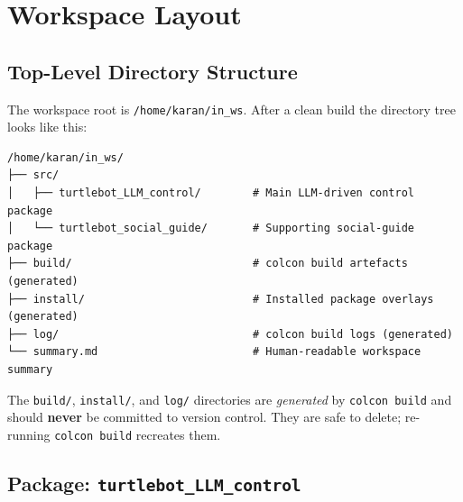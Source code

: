\documentclass[12pt,a4paper]{report}
\begin{document}
\chapter{Workspace Layout}
\label{ch:layout}

\section{Top-Level Directory Structure}

The workspace root is \texttt{/home/karan/in\_ws}.  After a clean build the
directory tree looks like this:

\begin{lstlisting}[style=bashstyle, caption={Top-level workspace directory tree}]
/home/karan/in_ws/
├── src/
│   ├── turtlebot_LLM_control/        # Main LLM-driven control package
│   └── turtlebot_social_guide/       # Supporting social-guide package
├── build/                            # colcon build artefacts (generated)
├── install/                          # Installed package overlays (generated)
├── log/                              # colcon build logs (generated)
└── summary.md                        # Human-readable workspace summary
\end{lstlisting}

\begin{tcolorbox}[warnbox, title=Important: Generated Directories]
  The \texttt{build/}, \texttt{install/}, and \texttt{log/} directories are
  \emph{generated} by \texttt{colcon build} and should \textbf{never} be
  committed to version control.  They are safe to delete; re-running
  \texttt{colcon build} recreates them.
\end{tcolorbox}

\section{Package: \texttt{turtlebot\_LLM\_control}}
\end{document}
